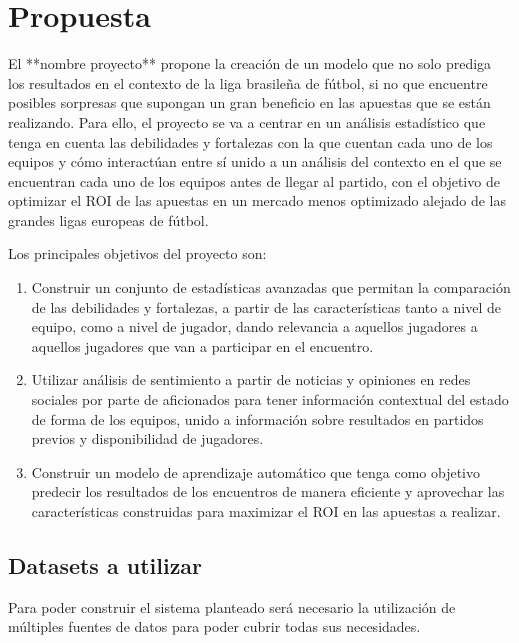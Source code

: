\section{Propuesta}

El **nombre proyecto** propone la creación de un modelo que no solo prediga los resultados en el contexto de la liga brasileña de fútbol, si no que encuentre posibles sorpresas que supongan un gran beneficio en las apuestas que se están realizando. Para ello, el proyecto se va a centrar en un análisis estadístico que tenga en cuenta las debilidades y fortalezas con la que cuentan cada uno de los equipos y cómo interactúan entre sí unido a un análisis del contexto en el que se encuentran cada uno de los equipos antes de llegar al partido, con el objetivo de optimizar el ROI de las apuestas en un mercado menos optimizado alejado de las grandes ligas europeas de fútbol.

Los principales objetivos del proyecto son:

\begin{enumerate}
    \item Construir un conjunto de estadísticas avanzadas que permitan la comparación de las debilidades y fortalezas, a partir de las características tanto a nivel de equipo, como a nivel de jugador, dando relevancia a aquellos jugadores a aquellos jugadores que van a participar en el encuentro.
    \item Utilizar análisis de sentimiento a partir de noticias y opiniones en redes sociales por parte de aficionados para tener información contextual del estado de forma de los equipos, unido a información sobre resultados en partidos previos y disponibilidad de jugadores.
    \item Construir un modelo de aprendizaje automático que tenga como objetivo predecir los resultados de los encuentros de manera eficiente y aprovechar las características construidas para maximizar el ROI en las apuestas a realizar.
\end{enumerate}

\subsection{Datasets a utilizar}

Para poder construir el sistema planteado será necesario la utilización de múltiples fuentes de datos para poder cubrir todas sus necesidades.

